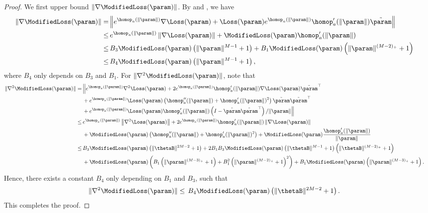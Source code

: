 \begin{proof}
We first upper bound $\| \nabla \ModifiedLoss(\param )\|$. By  and , we have
\begin{align*}
    \| \nabla \ModifiedLoss(\param )\| = \, & \Big\|e^{ \homop_a(\|\param \|)} \nabla \Loss (\param ) + \Loss(\param ) e^{\homop_a(\|\param \|)} \homop_a^\prime(\|\param \|) \tilde \param  \Big\| \\
    \le \, & e^{ \homop_a(\|\param \|)} \left\| \nabla \Loss (\param ) \right\| + \ModifiedLoss(\param) \homop_a^\prime (\|\param \|) \\
    \le \, & B_3 \ModifiedLoss (\param) \left( \| \param \|^{M-1} + 1 \right) + B_1 \ModifiedLoss (\param) \left( \| \param \|^{(M-2)_+} + 1 \right) \\
    \le \, & B_4 \ModifiedLoss(\param ) \left( \| \param \|^{M-1} + 1 \right),
\end{align*}
where $B_4$ only depends on $B_3$ and $B_1$. For $\| \nabla^2 \ModifiedLoss(\param )\|$, note that
\begin{align*}
    \| \nabla^2 \ModifiedLoss(\param ) \| 
    = \, & \Big \| e^{\homop_a(\|\param \|)} \nabla^2 \Loss(\param) + 2 e^{\homop_a(\|\param \|)} \homop_a' (\| \param \|) \nabla \Loss(\param) \tilde{\param}^\top \\
    & + e^{\homop_a(\|\param \|)} \Loss (\param) \left( \homop_a'' (\| \param \|) + \homop_a' (\| \param \|)^2 \right) \tilde{\param} \tilde{\param}^\top \\
    & + e^{\homop_a(\|\param \|)} \Loss(\param) \homop_a' (\| \param \|) \left( I - \tilde{\param} \tilde{\param}^\top \right) / \| \param \| \Big\| \\
    \le \, & e^{\homop_a(\|\param \|)} \left\| \nabla^2 \Loss(\param) \right\| + 2 e^{\homop_a(\|\param \|)} \homop_a' (\| \param \|) \left\| \nabla \Loss(\param) \right\| \\
    & + \ModifiedLoss (\param) \left( \homop_a'' (\| \param \|) + \homop_a' (\| \param \|)^2 \right) + \ModifiedLoss(\param) \frac{\homop_a' (\| \param \|)}{\| \param \|} \\
    \le \, & B_3 \ModifiedLoss (\param) \left( \| \thetaB \|^{2M - 2} + 1 \right) + 2 B_1 B_3 \ModifiedLoss (\param) \left( \| \thetaB \|^{M-1} + 1 \right) \left( \| \thetaB \|^{(M-2)_+} + 1 \right) \\
    & + \ModifiedLoss (\param) \left( B_1 \left( \|\param \|^{(M-3)_+} + 1 \right) + B_1^2 \left( \|\param \|^{(M-2)_+} + 1 \right)^2 \right) + B_1 \ModifiedLoss(\param) \left( \|\param \|^{(M-3)_+} + 1 \right).
\end{align*}
Hence, there exists a constant $B_4$ only depending on $B_1$ and $B_3$, such that
\begin{equation}
    \| \nabla^2 \ModifiedLoss(\param ) \| \le \, B_4 \ModifiedLoss (\param) \left( \| \thetaB \|^{2M - 2} + 1 \right).
\end{equation}
This completes the proof.
\end{proof}

